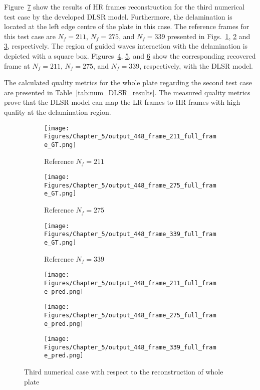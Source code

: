 Figure~\ref{fig:num_results_CS_448} show the results of HR frames reconstruction for the third numerical test case by the developed DLSR model.
Furthermore, the delamination is located at the left edge centre of the plate in this case.
The reference frames for this test case are $N_f=211$, $N_f=275$, and $N_f=339$ presented in Figs.~\ref{fig:ref_448_full_211}, \ref{fig:ref_448_full_275} and \ref{fig:ref_448_full_339}, respectively.
The region of guided waves interaction with the delamination is depicted with a square box.
Figures~\ref{fig:pred_448_full_211}, \ref{fig:pred_448_full_275}, and \ref{fig:pred_448_full_339} show the corresponding recovered frame at $N_f=211$, $N_f=275$, and $N_f=339$, respectively, with the DLSR model.

The calculated quality metrics for the whole plate regarding the second test case are presented in Table~\ref{tab:num_DLSR_results}.
The measured quality metrics prove that the DLSR model can map the LR frames to HR frames with high quality at the delamination region.
\begin{figure} [!ht]
	\centering
	\begin{subfigure}[b]{.32\textwidth}
		\centering
		\texttt{[image: Figures/Chapter\_5/output\_448\_frame\_211\_full\_frame\_GT.png]}
		\caption{Reference $N_f=211$}
		\label{fig:ref_448_full_211}
	\end{subfigure}
	\begin{subfigure}[b]{.32\textwidth}
		\centering
		\texttt{[image: Figures/Chapter\_5/output\_448\_frame\_275\_full\_frame\_GT.png]}
		\caption{Reference $N_f=275$}
		\label{fig:ref_448_full_275}
	\end{subfigure}
	\begin{subfigure}[b]{.32\textwidth}
		\centering
		\texttt{[image: Figures/Chapter\_5/output\_448\_frame\_339\_full\_frame\_GT.png]}
		\caption{Reference $N_f=339$}
		\label{fig:ref_448_full_339}	
	\end{subfigure}
	\begin{subfigure}[b]{.32\textwidth}
		\centering
		\texttt{[image: Figures/Chapter\_5/output\_448\_frame\_211\_full\_frame\_pred.png]}
		\caption{}
		\label{fig:pred_448_full_211}
	\end{subfigure}
	\begin{subfigure}[b]{.32\textwidth}
		\centering
		\texttt{[image: Figures/Chapter\_5/output\_448\_frame\_275\_full\_frame\_pred.png]}
		\caption{}
		\label{fig:pred_448_full_275}
	\end{subfigure}
	\begin{subfigure}[b]{.32\textwidth}
		\centering
		\texttt{[image: Figures/Chapter\_5/output\_448\_frame\_339\_full\_frame\_pred.png]}
		\caption{}
		\label{fig:pred_448_full_339}	
	\end{subfigure}
	\caption{Third numerical case with respect to the reconstruction of whole plate}
	\label{fig:num_results_CS_448}
\end{figure}

